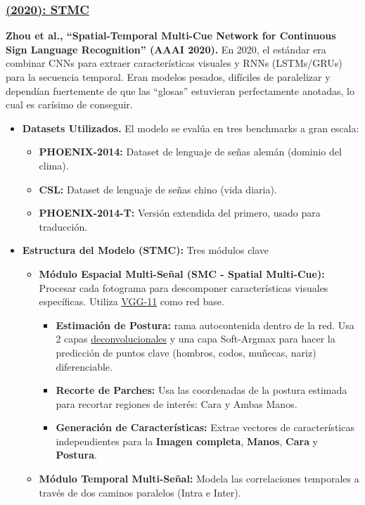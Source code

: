 \documentclass[11pt,a4paper]{article}
\begin{document}
\subsubsection{\underline{(2020): STMC}}
\textbf{Zhou et al., ``Spatial-Temporal Multi-Cue Network for Continuous Sign Language Recognition'' (AAAI 2020).}
En 2020, el estándar era combinar CNNs para extraer características visuales y RNNs (LSTMs/GRUs) para la secuencia temporal. Eran modelos pesados, difíciles de paralelizar y dependían fuertemente de que las ``glosas'' estuvieran perfectamente anotadas, lo cual es carísimo de conseguir.
\begin{itemize}
	\item \textbf{Datasets Utilizados.} El modelo se evalúa en tres benchmarks a gran escala:
	\begin {itemize}
		\item \textbf{PHOENIX-2014:} Dataset de lenguaje de señas alemán (dominio del clima).
		\item \textbf{CSL:} Dataset de lenguaje de señas chino (vida diaria).
		\item \textbf{PHOENIX-2014-T:} Versión extendida del primero, usado para traducción.
	\end{itemize}
	\item \textbf{Estructura del Modelo (STMC):} Tres módulos clave
	\begin{itemize}
		\item\textbf{Módulo Espacial Multi-Señal (SMC - Spatial Multi-Cue):} Procesar cada fotograma para descomponer características visuales específicas. Utiliza \href{https://docs.pytorch.org/vision/main/models/generated/torchvision.models.vgg11.html}{VGG-11} como red base.
		\begin{itemize}
			\item \textbf{Estimación de Postura:} rama autocontenida dentro de la red. Usa 2 capas \href{https://datasciencepythonblog.net/conv-transpose-tensorflow/}{deconvolucionales} y una capa Soft-Argmax para hacer la predicción de puntos clave (hombros, codos, muñecas, nariz) diferenciable.
			\item \textbf{Recorte de Parches:} Usa las coordenadas de la postura estimada para recortar regiones de interés: Cara y Ambas Manos.
			\item \textbf{Generación de Características:} Extrae vectores de características independientes para la \textbf{Imagen completa}, \textbf{Manos}, \textbf{Cara} y \textbf{Postura}.
		\end{itemize}
		\item \textbf{Módulo Temporal Multi-Señal:} Modela las correlaciones temporales a través de dos caminos paralelos (Intra e Inter).

\end{itemize}
\end{itemize}
\end{document}
